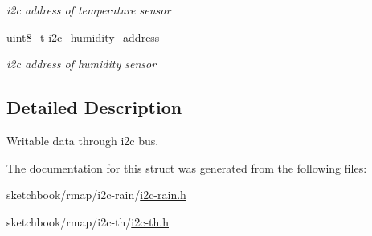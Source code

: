 \begin{DoxyCompactItemize}
\begin{DoxyCompactList}\small\item\em i2c address of temperature sensor \end{DoxyCompactList}\item 
\mbox{\label{structwritable__data__t_af7dee4cff91376d89745a86ba747c35f}} 
uint8\+\_\+t \hyperlink{structwritable__data__t_af7dee4cff91376d89745a86ba747c35f}{i2c\+\_\+humidity\+\_\+address}
\begin{DoxyCompactList}\small\item\em i2c address of humidity sensor \end{DoxyCompactList}\end{DoxyCompactItemize}


\subsection{Detailed Description}
Writable data through i2c bus. 

The documentation for this struct was generated from the following files\+:\begin{DoxyCompactItemize}
\item 
sketchbook/rmap/i2c-\/rain/\hyperlink{i2c-rain_8h}{i2c-\/rain.\+h}\item 
sketchbook/rmap/i2c-\/th/\hyperlink{i2c-th_8h}{i2c-\/th.\+h}\end{DoxyCompactItemize}
